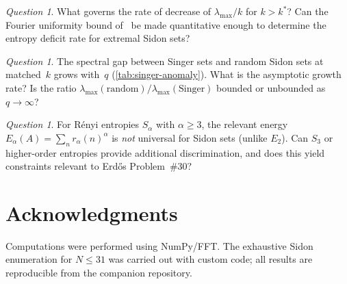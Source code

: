 \documentclass[11pt]{article}
\theoremstyle{definition}
\theoremstyle{remark}
\newtheorem{question}[theorem]{Question}
\newcommand{\lmax}{\lambda_{\max}}
\begin{document}
\begin{question}\label{q:relaxation-rate}
What governs the rate of decrease of $\lmax/k$ for $k > k^*$?
Can the Fourier uniformity bound of~\cite{OP2021} be made
quantitative enough to determine the entropy deficit rate for
extremal Sidon sets?
\end{question}

\begin{question}\label{q:spectral-gap-growth}
The spectral gap between Singer sets and random Sidon sets
at matched~$k$ grows with~$q$ (\cref{tab:singer-anomaly}).
What is the asymptotic growth rate?  Is the ratio
$\lmax(\text{random})/\lmax(\text{Singer})$ bounded or
unbounded as $q \to \infty$?
\end{question}

\begin{question}\label{q:higher-renyi}
For R\'enyi entropies $S_\alpha$ with $\alpha \ge 3$, the
relevant energy $E_\alpha(A) = \sum_n r_\alpha(n)^\alpha$
is \emph{not} universal for Sidon sets (unlike $E_2$).
Can $S_3$ or higher-order entropies provide additional
discrimination, and does this yield constraints relevant
to Erd\H{o}s Problem~\#30?
\end{question}

\section*{Acknowledgments}

Computations were performed using NumPy/FFT.
The exhaustive Sidon enumeration for $N \le 31$ was carried out
with custom code; all results are reproducible from the
companion repository.
\end{document}
